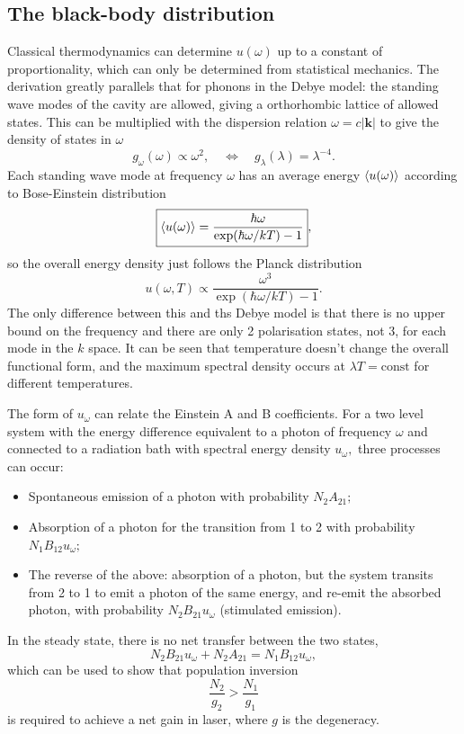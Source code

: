 \documentclass{article}
\theoremstyle{nonumberplain}
\begin{document}
\subsection{The black-body distribution}
Classical thermodynamics can determine $u(\omega)$ up to a constant of proportionality, which can only be determined from statistical mechanics. The derivation greatly parallels that for phonons in the Debye model: the standing wave modes of the cavity are allowed, giving a orthorhombic lattice of allowed states. This can be multiplied with the dispersion relation $\omega  = c\left\vert \mathbf{k} \right\vert $ to give the density of states in $\omega$
\[
    \boxed{g_\omega(\omega ) \propto \omega ^{2},} \quad \Leftrightarrow \quad g_\lambda(\lambda) = \lambda^{-4}. 
\]
Each standing wave mode at frequency $\omega$ has an average energy $\expval{u(\omega)}$ according to Bose-Einstein distribution
\[
    \boxed{\expval{u(\omega)} = \frac{\hbar \omega}{\exp(\hbar \omega / k T) - 1}},
\]
so the overall energy density just follows the Planck distribution
\[
    u(\omega, T) \propto \frac{\omega ^3}{\exp(\hbar \omega  / kT) - 1}.
\]
The only difference between this and ths Debye model is that there is no upper bound on the frequency and there are only 2 polarisation states, not 3, for each mode in the $k$ space. It can be seen that temperature doesn't change the overall functional form, and the maximum spectral density occurs at $\lambda T = \mathrm{const} $ for different temperatures. 

The form of $u_\omega$ can relate the Einstein A and B coefficients. For a two level system with the energy difference equivalent to a photon of frequency $\omega$ and connected to a radiation bath with spectral energy density $u_\omega,$ three processes can occur: 
\begin{itemize}
    \item Spontaneous emission of a photon with probability $N_2 A_{21};$
    \item Absorption of a photon for the transition from 1 to 2 with probability $N_1 B_{12} u_\omega;$
    \item The reverse of the above: absorption of a photon, but the system transits from 2 to 1 to emit a photon of the same energy, and re-emit the absorbed photon, with probability $N_2 B_{21} u_{\omega}$ (stimulated emission).
\end{itemize}
In the steady state, there is no net transfer between the two states, 
\[
    N_2 B_{21} u_{\omega } + N_2 A_{21} = N_1 B_{12} u_\omega, 
\]
which can be used to show that population inversion 
\[
    \frac{N_2}{g_2} > \frac{N_1}{g_1}
\]
is required to achieve a net gain in laser, where $g$ is the degeneracy. 
\end{document}
